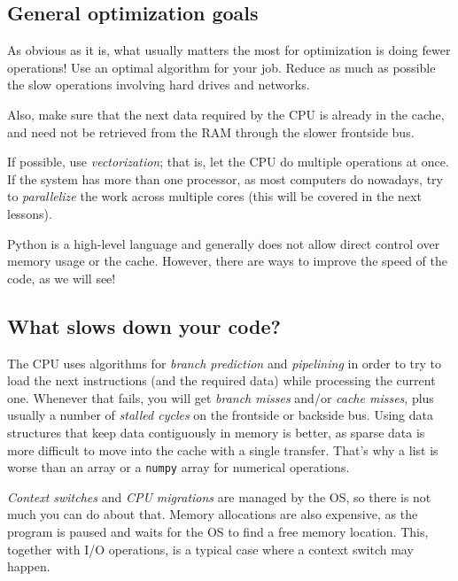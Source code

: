 \subsection{General optimization goals}
As obvious as it is, what usually matters the most for optimization is doing fewer operations! Use an optimal algorithm for your job. Reduce as much as possible the slow operations involving hard drives and networks.

Also, make sure that the next data required by the CPU is already in the cache, and need not be retrieved from the RAM through the slower frontside bus. 

If possible, use \textit{vectorization}; that is, let the CPU do multiple operations at once. If the system has more than one processor, as most computers do nowadays, try to \textit{parallelize} the work across multiple cores (this will be covered in the next lessons). 

Python is a high-level language and generally does not allow direct control over memory usage or the cache. However, there are ways to improve the speed of the code, as we will see!

\subsection{What slows down your code?}
The CPU uses algorithms for \emph{branch prediction} and \emph{pipelining} in order to try to load the next instructions (and the required data) while processing the current one. Whenever that fails, you will get \emph{branch misses} and/or \emph{cache misses}, plus usually a number of \emph{stalled cycles} on the frontside or backside bus. Using data structures that keep data contiguously in memory is better, as sparse data is more difficult to move into the cache with a single transfer. That's why a list is worse than an array or a \texttt{numpy} array for numerical operations. 

\emph{Context switches} and \emph{CPU migrations} are managed by the OS, so there is not much you can do about that. Memory allocations are also expensive, as the program is paused and waits for the OS to find a free memory location. This, together with I/O operations, is a typical case where a context switch may happen.